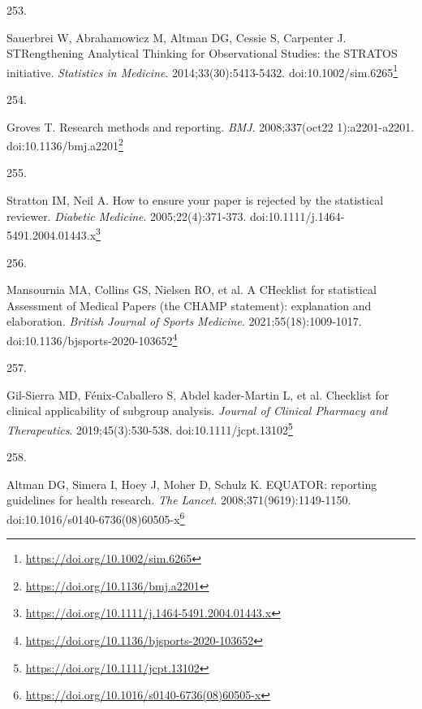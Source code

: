 \documentclass[
  a4paper,
]{book}
\newlength{\cslhangindent}
\newlength{\csllabelwidth}
\newlength{\cslentryspacingunit} %
\newenvironment{CSLReferences}[2] %
 {%
  \setlength{\parindent}{0pt}
  \ifodd #1
  \let\oldpar\par
  \def\par{\hangindent=\cslhangindent\oldpar}
  \fi
  \setlength{\parskip}{#2\cslentryspacingunit}
 }%
 {}
\newcommand{\CSLLeftMargin}[1]{\parbox[t]{\csllabelwidth}{#1}}
\newcommand{\CSLRightInline}[1]{\parbox[t]{\linewidth - \csllabelwidth}{#1}\break}
\renewcommand{\href}[2]{#2\footnote{\url{#1}}}
\begin{document}
\begin{CSLReferences}{0}{0}
\leavevmode{}%
\CSLLeftMargin{253. }%
\CSLRightInline{Sauerbrei W, Abrahamowicz M, Altman DG, Cessie S, Carpenter J. STRengthening Analytical Thinking for Observational Studies: the STRATOS initiative. \emph{Statistics in Medicine}. 2014;33(30):5413-5432. doi:\href{https://doi.org/10.1002/sim.6265}{10.1002/sim.6265}}

\leavevmode{}%
\CSLLeftMargin{254. }%
\CSLRightInline{Groves T. Research methods and reporting. \emph{BMJ}. 2008;337(oct22 1):a2201-a2201. doi:\href{https://doi.org/10.1136/bmj.a2201}{10.1136/bmj.a2201}}

\leavevmode{}%
\CSLLeftMargin{255. }%
\CSLRightInline{Stratton IM, Neil A. How to ensure your paper is rejected by the statistical reviewer. \emph{Diabetic Medicine}. 2005;22(4):371-373. doi:\href{https://doi.org/10.1111/j.1464-5491.2004.01443.x}{10.1111/j.1464-5491.2004.01443.x}}

\leavevmode{}%
\CSLLeftMargin{256. }%
\CSLRightInline{Mansournia MA, Collins GS, Nielsen RO, et al. A CHecklist for statistical Assessment of Medical Papers (the CHAMP statement): explanation and elaboration. \emph{British Journal of Sports Medicine}. 2021;55(18):1009-1017. doi:\href{https://doi.org/10.1136/bjsports-2020-103652}{10.1136/bjsports-2020-103652}}

\leavevmode{}%
\CSLLeftMargin{257. }%
\CSLRightInline{Gil-Sierra MD, Fénix-Caballero S, Abdel kader-Martin L, et al. Checklist for clinical applicability of subgroup analysis. \emph{Journal of Clinical Pharmacy and Therapeutics}. 2019;45(3):530-538. doi:\href{https://doi.org/10.1111/jcpt.13102}{10.1111/jcpt.13102}}

\leavevmode{}%
\CSLLeftMargin{258. }%
\CSLRightInline{Altman DG, Simera I, Hoey J, Moher D, Schulz K. EQUATOR: reporting guidelines for health research. \emph{The Lancet}. 2008;371(9619):1149-1150. doi:\href{https://doi.org/10.1016/s0140-6736(08)60505-x}{10.1016/s0140-6736(08)60505-x}}

\end{CSLReferences}


\end{document}
